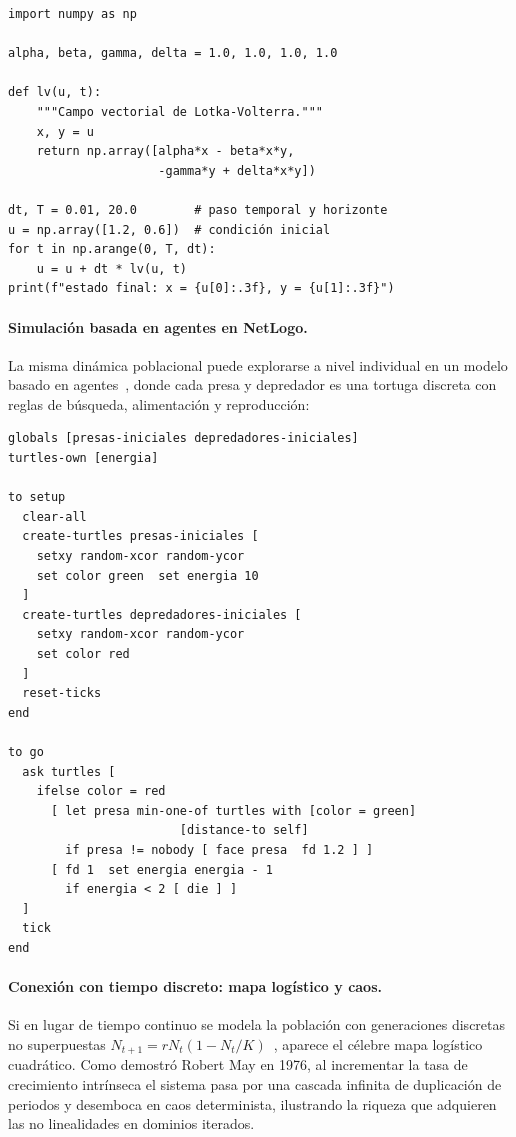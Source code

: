 \begin{verbatim}
import numpy as np

alpha, beta, gamma, delta = 1.0, 1.0, 1.0, 1.0

def lv(u, t):
    """Campo vectorial de Lotka-Volterra."""
    x, y = u
    return np.array([alpha*x - beta*x*y,
                     -gamma*y + delta*x*y])

dt, T = 0.01, 20.0        # paso temporal y horizonte
u = np.array([1.2, 0.6])  # condición inicial
for t in np.arange(0, T, dt):
    u = u + dt * lv(u, t)
print(f"estado final: x = {u[0]:.3f}, y = {u[1]:.3f}")
\end{verbatim}

\paragraph{Simulación basada en agentes en NetLogo.}
La misma dinámica poblacional puede explorarse a nivel individual en un modelo basado en agentes~\cite{netlogo}, donde cada presa y depredador es una tortuga discreta con reglas de búsqueda, alimentación y reproducción:

\begin{verbatim}
globals [presas-iniciales depredadores-iniciales]
turtles-own [energia]

to setup
  clear-all
  create-turtles presas-iniciales [
    setxy random-xcor random-ycor
    set color green  set energia 10
  ]
  create-turtles depredadores-iniciales [
    setxy random-xcor random-ycor
    set color red
  ]
  reset-ticks
end

to go
  ask turtles [
    ifelse color = red
      [ let presa min-one-of turtles with [color = green]
                        [distance-to self]
        if presa != nobody [ face presa  fd 1.2 ] ]
      [ fd 1  set energia energia - 1
        if energia < 2 [ die ] ]
  ]
  tick
end
\end{verbatim}

\paragraph{Conexión con tiempo discreto: mapa logístico y caos.}
Si en lugar de tiempo continuo se modela la población con generaciones discretas no superpuestas $N_{t+1} = r N_t (1 - N_t/K)$~\cite{may1976}, aparece el célebre mapa logístico cuadrático. Como demostró Robert May en 1976, al incrementar la tasa de crecimiento intrínseca el sistema pasa por una cascada infinita de duplicación de periodos y desemboca en caos determinista, ilustrando la riqueza que adquieren las no linealidades en dominios iterados.

